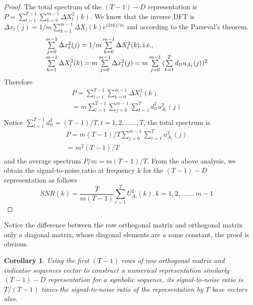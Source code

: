 \documentclass[preprint,authoryear,12pt]{elsarticle}
\newtheorem{cor}[thm]{Corollary}
\begin{document}
\begin{proof}
The total spectrum of the $(T-1)-D$  representation is $P = \sum\limits_{l = 1}^{T - 1} {\sum\limits_{k = 0}^{m - 1} {\Delta X_l ^2 (k)} }. $  We know that the inverse DFT is $\Delta x_l (j) = 1/m\sum\limits_{k = 1}^{m - 1} {\Delta X_l (k)e^{i2\pi kj/m} } $
 and according to the Parseval's theorem.
 $$\begin{array}{l}
 \sum\limits_{j = 0}^{m - 1} {\Delta x_l ^2 } (j) = 1/m\sum\limits_{k = 0}^{m - 1} {\Delta X_l ^2 (k)} ,{\rm{i}}{\rm{.e}}{\rm{.,}} \\
 \sum\limits_{k = 1}^{m - 1} {\Delta X_l ^2 (k)}  = m\sum\limits_{j = 0}^{m - 1} {\Delta x_l ^2 } (j) = m\sum\limits_{j = 0}^{m - 1} {(\sum\limits_{t = 1}^T {d_{lt} u_{A_t} (j )} } )^2  \\
 \end{array}
 $$
 Therefore\\
 $$
 \begin{array}{l}
 P = \sum\limits_{l = 1}^{T - 1} {\sum\limits_{k = 0}^{m - 1} {\Delta X_l ^2 (k)} }  \\
  = m\sum\limits_{l = 1}^{T - 1} {\sum\limits_{j = 0}^{m - 1} {\sum\limits_{t = 1}^T {d_{lt} ^2 u_{A_t} ^2 (j)} } }  \\
 \end{array}
 $$
 Notice $\sum\limits_{l = 1}^{T - 1} {d^2 _{lt} }  = (T - 1)/T,t = 1,2,......,T$, the total spectrum is
 $$
 \begin{array}{l}
 P = m(T - 1)/T\sum\limits_{j = 0}^{m - 1} {\sum\limits_{t = 1}^T {u_{A_t} ^2 (j)} }  \\
  = m^2 (T - 1)/T \\
 \end{array}
 $$
 and the average spectrum $P/m = m(T - 1)/T$. From the above analysis, we obtain the signal-to-noise ratio at frequency k for the $(T-1)-D$  representation as follows
 $$
 SNR(k) = \frac{T}{{m(T - 1)}}\sum\limits_{t = 1}^T {U_{A_t} ^2 (k)} ,k = 1,2,......,m - 1
 $$
\end{proof}

Notice the difference between the row orthogonal matrix and orthogonal matrix only a diagonal matrix, whose diagonal elements are a same constant, the proof is obvious.
\begin{cor}
Using the first $(T-1)$ rows of row orthogonal matrix and indicator sequences vector to construct a numerical representation similarly $(T-1)-D$ representation for a symbolic sequence, its signal-to-noise ratio is $T/(T-1)$ times the signal-to-noise ratio of the representation by $T$ base vectors also.
\end{cor}
\end{document}
